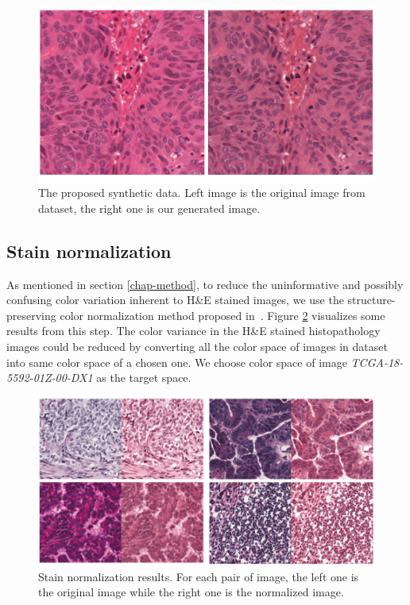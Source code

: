 \begin{figure}[thb]
    \centering
    \includegraphics[width=\textwidth]{resources/5_synthetic_data.png}
    \caption{The proposed synthetic data. Left image is the original image from \cite{he_dataset_kumar} dataset, the right one is our generated image.}
    \label{fig:new_synthetic_data}
\end{figure}

\subsection{Stain normalization}

As mentioned in section \ref{chap-method}, to reduce the uninformative and possibly confusing color variation inherent to H\&E stained images, we use the structure-preserving color normalization method proposed in~\cite{7164042}. Figure \ref{fig:stain_normalize} visualizes some results from this step. The color variance in the H\&E stained histopathology images could be reduced by converting all the color space of images in dataset into same color space of a chosen one. We choose color space of image \textit{TCGA-18-5592-01Z-00-DX1} as the target space. 

\begin{figure}[thb]
    \centering
    \includegraphics[width=\textwidth]{resources/5_stain_normalized.png}
    \caption{Stain normalization results. For each pair of image, the left one is the original image while the right one is the normalized image.}
    \label{fig:stain_normalize}
\end{figure}

